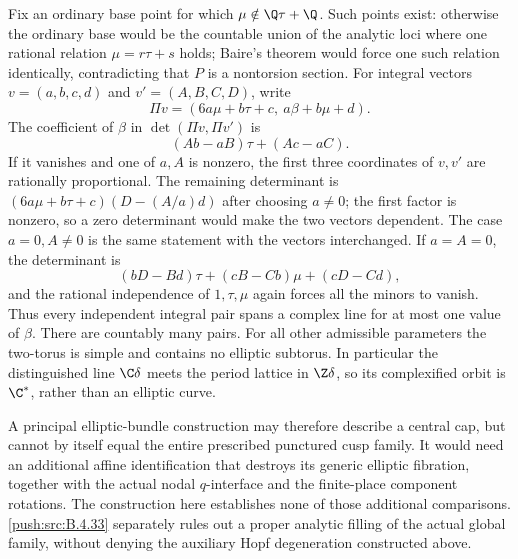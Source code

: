 \begin{remark}
Fix an ordinary base point for which
$\mu\notin\Q\tau+\Q$.  Such points exist: otherwise the
ordinary base would be the countable union of the analytic loci
where one rational relation $\mu=r\tau+s$ holds; Baire's
theorem would force one such relation identically, contradicting
that $P$ is a nontorsion section.  For integral vectors
$v=(a,b,c,d)$ and $v'=(A,B,C,D)$, write
\[
 \Pi v=(6a\mu+b\tau+c,\ a\beta+b\mu+d).
\]
The coefficient of $\beta$ in
$\det(\Pi v,\Pi v')$ is
\[
 (Ab-aB)\tau+(Ac-aC).
\]
If it vanishes and one of $a,A$ is nonzero, the first three
coordinates of $v,v'$ are rationally proportional.  The
remaining determinant is
$(6a\mu+b\tau+c)(D-(A/a)d)$ after choosing $a\ne0$;
the first factor is nonzero, so a zero determinant would make
the two vectors dependent.  The case $a=0,A\ne0$ is the
same statement with the vectors interchanged.  If $a=A=0$,
the determinant is
\[
 (bD-Bd)\tau+(cB-Cb)\mu+(cD-Cd),
\]
and the rational independence of $1,\tau,\mu$ again forces
all the minors to vanish.  Thus every independent integral
pair spans a complex line for at most one value of $\beta$.
There are countably many pairs.  For all other admissible
parameters the two-torus is simple and contains no elliptic
subtorus.  In particular the distinguished line $\C\delta$
meets the period lattice in $\Z\delta$, so its complexified
orbit is $\C^*$, rather than an elliptic curve.

A principal elliptic-bundle construction may therefore describe
a central cap, but cannot by itself equal the entire prescribed
punctured cusp family.  It would need an additional affine
identification that destroys its generic elliptic fibration,
together with the actual nodal $q$-interface and the finite-place
component rotations. The construction here establishes none of
those additional comparisons. \ref{push:src:B.4.33} separately rules out a proper
analytic filling of the actual global family, without denying the
auxiliary Hopf degeneration constructed above.
\end{remark}


